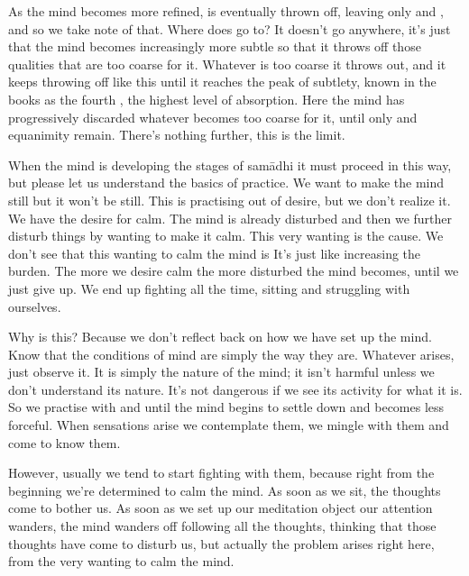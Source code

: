 As the mind becomes more refined,  is eventually thrown off, leaving only  and , and so we take note of that. Where does  go to? It doesn't go anywhere, it's just that the mind becomes increasingly more subtle so that it throws off those qualities that are too coarse for it. Whatever is too coarse it throws out, and it keeps throwing off like this until it reaches the peak of subtlety, known in the books as the fourth , the highest level of absorption. Here the mind has progressively discarded whatever becomes too coarse for it, until only  and  equanimity remain. There's nothing further, this is the limit. 

When the mind is developing the stages of sam\=adhi it must proceed in this way, but please let us understand the basics of practice. We want to make the mind still but it won't be still. This is practising out of desire, but we don't realize it. We have the desire for calm. The mind is already disturbed and then we further disturb things by wanting to make it calm. This very wanting is the cause. We don't see that this wanting to calm the mind is  It's just like increasing the burden. The more we desire calm the more disturbed the mind becomes, until we just give up. We end up fighting all the time, sitting and struggling with ourselves. 

Why is this? Because we don't reflect back on how we have set up the mind. Know that the conditions of mind are simply the way they are. Whatever arises, just observe it. It is simply the nature of the mind; it isn't harmful unless we don't understand its nature. It's not dangerous if we see its activity for what it is. So we practise with  and  until the mind begins to settle down and becomes less forceful. When sensations arise we contemplate them, we mingle with them and come to know them. 

However, usually we tend to start fighting with them, because right from the beginning we're determined to calm the mind. As soon as we sit, the thoughts come to bother us. As soon as we set up our meditation object our attention wanders, the mind wanders off following all the thoughts, thinking that those thoughts have come to disturb us, but actually the problem arises right here, from the very wanting to calm the mind. 

